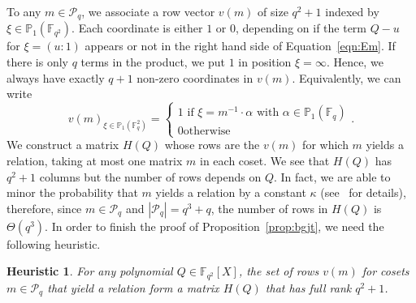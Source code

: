 \documentclass[a4paper,11pt]{article}
\theoremstyle{break}
\newtheorem{heur}[thm]{Heuristic}
\theoremstyle{sc}
\theoremstyle{definition}
\theoremstyle{remark}
\begin{document}
To any $m\in\mathcal P_q$, we associate a row vector $v(m)$ of size $q^2+1$
indexed by $\xi\in\mathbb{P}_1(\mathbb{F}_{q^2})$. Each coordinate is either $1$
or $0$, depending on if the term $Q-u$ for $\xi=(u:1)$ appears or not in the
right hand side of Equation~\eqref{eqn:Em}. If there
is only $q$ terms in the product, we put $1$ in position $\xi=\infty$. Hence, we
always have exactly $q+1$ non-zero coordinates in $v(m)$. Equivalently, we can
write
\[
  v(m)_{\xi\in\mathbb{P}_1(\mathbb{F}_q^2)}=\begin{cases} 1\text{ if
    }\xi=m^{-1}\cdot\alpha\text{ with }\alpha\in\mathbb{P}_1(\mathbb{F}_q) \\ 0\text{
    otherwise} \end{cases}.
\]
We construct a matrix $H(Q)$ whose rows are the $v(m)$ for which $m$ yields a
relation, taking at most one matrix $m$ in each coset. We see that $H(Q)$ has
$q^2+1$ columns but the number of rows depends on $Q$. In fact, we are able to
minor the probability that $m$ yields a relation by a constant $\kappa$
(see~\cite{BGJT13} for details),
therefore, since $m\in\mathcal P_q$ and $|\mathcal P_q|=q^3+q$, the number of
rows in $H(Q)$ is $\Theta(q^3)$. In order to finish the proof of
Proposition~\ref{prop:bgjt}, we need the following heuristic.
\begin{heur}
  \label{heur:full-rank}
  For any polynomial $Q\in\mathbb{F}_{q^{2}}[X]$, the set of rows $v(m)$ for
  cosets $m\in\mathcal P_q$ that yield a relation form a matrix $H(Q)$ that has
  full rank $q^2+1$.
\end{heur}
\end{document}
